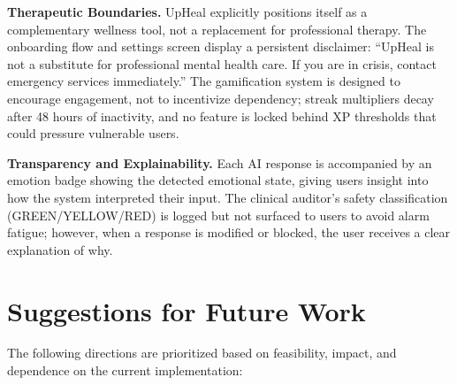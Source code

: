 \documentclass[12pt,a4paper,oneside,openany]{report}
\begin{document}
\textbf{Therapeutic Boundaries.} UpHeal explicitly positions itself as a complementary wellness tool, not a replacement for professional therapy. The onboarding flow and settings screen display a persistent disclaimer: ``UpHeal is not a substitute for professional mental health care. If you are in crisis, contact emergency services immediately.'' The gamification system is designed to encourage engagement, not to incentivize dependency; streak multipliers decay after 48 hours of inactivity, and no feature is locked behind XP thresholds that could pressure vulnerable users.

\textbf{Transparency and Explainability.} Each AI response is accompanied by an emotion badge showing the detected emotional state, giving users insight into how the system interpreted their input. The clinical auditor's safety classification (GREEN/YELLOW/RED) is logged but not surfaced to users to avoid alarm fatigue; however, when a response is modified or blocked, the user receives a clear explanation of why.

\section{Suggestions for Future Work}

The following directions are prioritized based on feasibility, impact, and dependence on the current implementation:
\end{document}
